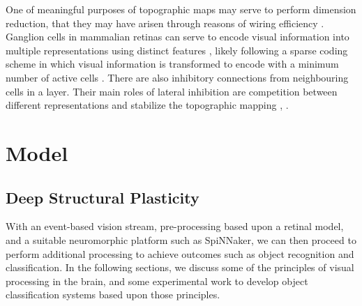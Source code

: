\documentclass[letterpaper, 10 pt, conference]{ieeeconf}  %
\begin{document}
One of meaningful purposes of topographic maps may serve to perform dimension reduction, that they may have arisen through reasons of wiring efficiency \cite{bamford2010synaptic}.
Ganglion cells in mammalian retinas can serve to encode visual information into multiple representations using distinct features \cite{roska2014retina}, likely following a sparse coding scheme in which visual information is transformed to encode with a minimum number of active cells \cite{Field1994}.
There are also inhibitory connections from neighbouring cells in a layer. Their main roles of lateral inhibition are competition between different representations and stabilize the topographic mapping \cite{Kisvarday1994}, \cite{mauss2015neural}.

\section{Model}

\subsection{Deep Structural Plasticity}

With an event-based vision stream, pre-processing based upon a retinal model, and a suitable neuromorphic platform such as SpiNNaker, we can then proceed to perform additional processing to achieve outcomes such as object recognition and classification. In the following sections, we discuss some of the principles of visual processing in the brain, and some experimental work to develop object classification systems based upon those principles.
\end{document}
